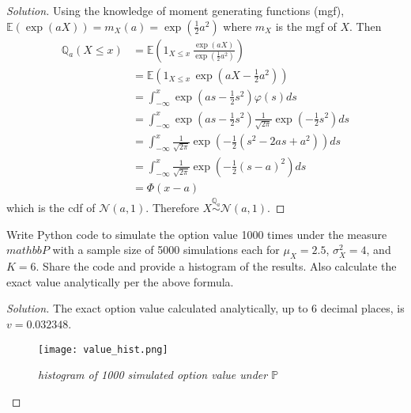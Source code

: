 \documentclass[10pt]{article}
\newcommand{\E}{\mathbb{E}}
\newcommand{\Q}{\mathbb{Q}}
\newenvironment{problem}[2][Problem]{\begin{trivlist}
\item[\hskip \labelsep {\bfseries #1}\hskip \labelsep {\bfseries #2.}]}{\end{trivlist}}
\begin{document}
\begin{proof}[Solution]
    Using the knowledge of moment generating functions (mgf), $\E(\exp(aX)) = m_X(a) = \exp{\left(\frac{1}{2} a^2\right)}$ where $m_X$ is the mgf of $X$. Then
    \begin{align*}
        \Q_a(X \leq x) &= \E \left(1_{X \leq x} \, \frac{\exp{(aX)}}{\exp{(\frac{1}{2}a^2)}}\right) \\
        &= \E \left(1_{X \leq x} \, \exp{\left(aX - \frac{1}{2}a^2\right)}\right) \\
        &= \int_{-\infty}^{x} \exp{\left(as - \frac{1}{2}s^2\right)} \varphi(s) ds \\
        &= \int_{-\infty}^{x} \exp{\left(as - \frac{1}{2}s^2\right)} \frac{1}{\sqrt{2\pi}} \exp{\left(-\frac{1}{2}s^2\right)} ds \\
        &= \int_{-\infty}^{x} \frac{1}{\sqrt{2\pi}} \exp{\left(-\frac{1}{2}(s^2 - 2as + a^2)\right)} ds \\
        &= \int_{-\infty}^{x} \frac{1}{\sqrt{2\pi}} \exp{\left(-\frac{1}{2}(s - a)^2\right)} ds \\
        &= \Phi{(x - a)}
    \end{align*}
    which is the cdf of $\mathcal{N}(a, 1)$. Therefore $X \overset{\Q_a}{\sim} \mathcal{N}(a, 1)$.
\end{proof}



\begin{problem}{4}
    Write Python code to simulate the option value 1000 times under the measure $mathbb{P}$ with a sample size of 5000 simulations each for $\mu_X = 2.5$, $\sigma_X^2 = 4$, and $K = 6$.
    Share the code and provide a histogram of the results.
    Also calculate the exact value analytically per the above formula.
\end{problem}
    
\begin{proof}[Solution]
    The exact option value calculated analytically, up to 6 decimal places, is $v = 0.032348$.
    \begin{figure}[H]
        \begin{center}
            \texttt{[image: value\_hist.png]}
            \caption{\textit{histogram of 1000 simulated option value under $\mathbb{P}$}}
            \label{fig:value_hist}
        \end{center}
    \end{figure}
    
\end{proof}
\end{document}
